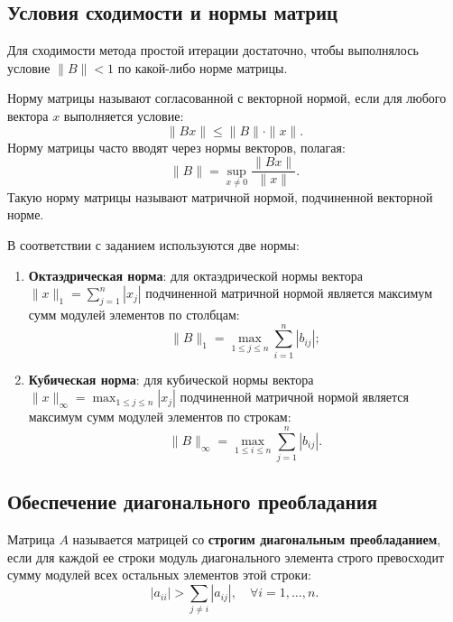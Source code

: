 \subsection{Условия сходимости и нормы матриц}

Для сходимости метода простой итерации достаточно, чтобы выполнялось условие $\|B\| < 1$ по какой-либо норме матрицы.

Норму матрицы называют согласованной с векторной нормой, если для любого вектора $x$ выполняется условие:
\begin{equation}
    \|Bx\| \le \|B\| \cdot \|x\|.
\end{equation}
Норму матрицы часто вводят через нормы векторов, полагая:
\begin{equation}
    \|B\| = \sup_{x \neq 0} \frac{\|Bx\|}{\|x\|}.
\end{equation}
Такую норму матрицы называют матричной нормой, подчиненной векторной норме.

В соответствии с заданием используются две нормы:
\begin{enumerate}
    \item \textbf{Октаэдрическая норма}: для октаэдрической нормы вектора $\|x\|_1 = \sum_{j=1}^n |x_j|$ подчиненной матричной нормой является максимум сумм модулей элементов по столбцам:
    \begin{equation}
        \|B\|_1 = \max_{1 \le j \le n} \sum_{i=1}^n |b_{ij}|;
        \label{eq:norm_oct}
    \end{equation}
    \item \textbf{Кубическая норма}: для кубической нормы вектора $\|x\|_\infty = \max_{1 \le j \le n} |x_j|$ подчиненной матричной нормой является максимум сумм модулей элементов по строкам:
    \begin{equation}
        \|B\|_\infty = \max_{1 \le i \le n} \sum_{j=1}^n |b_{ij}|.
        \label{eq:norm_cub}
    \end{equation}
\end{enumerate}

\subsection{Обеспечение диагонального преобладания}

Матрица $A$ называется матрицей со \textbf{строгим диагональным преобладанием}, если для каждой ее строки модуль диагонального элемента строго превосходит сумму модулей всех остальных элементов этой строки:
\begin{equation}
    |a_{ii}| > \sum_{j \neq i} |a_{ij}|, \quad \forall i = 1, \ldots, n.
    \label{eq:diag_dom}
\end{equation}

